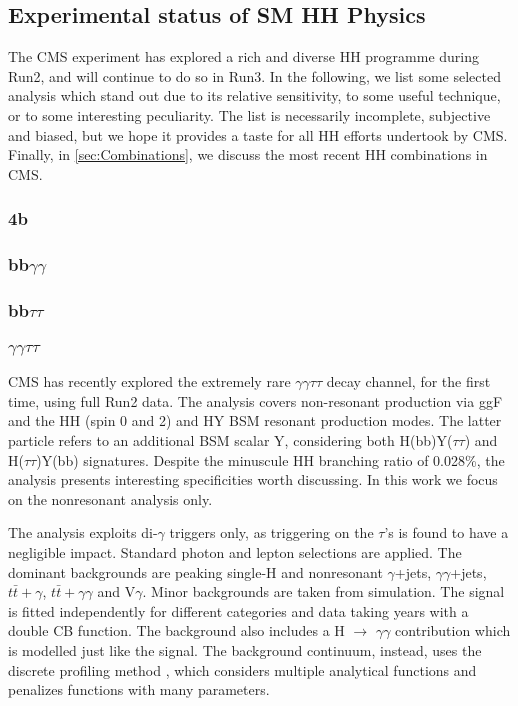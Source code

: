 \documentclass[11pt]{article}
\newcommand{\hgg}{H $\rightarrow$ $\gamma\gamma$}
\newcommand{\ttbar}{t\bar{t}}
\begin{document}
\subsection{Experimental status of SM HH Physics}
\label{sec:orgb825e03}
The \ac{CMS} experiment has explored a rich and diverse HH programme during Run2, and will continue to do so in Run3.
In the following, we list some selected analysis which stand out due to its relative sensitivity, to some useful technique, or to some interesting peculiarity.
The list is necessarily incomplete, subjective and biased, but we hope it provides a taste for all HH efforts undertook by \ac{CMS}.
Finally, in \cref{sec:Combinations}, we discuss the most recent HH combinations in \ac{CMS}.

\subsubsection{4b}
\label{sec:orgea7e127}
\label{sec:bbbb}
\subsubsection{bb\(\gamma \gamma\)}
\label{sec:orgca956e4}
\label{sec::bbgg}
\subsubsection{bb\(\tau \tau\)}
\label{sec:org9ba3362}
\label{sec::bbtautau}
\subsubsection{\(\gamma \gamma \tau \tau\)}
\label{sec:org7b90a0b}
\ac{CMS} has recently explored the extremely rare \(\gamma \gamma \tau \tau\) decay channel, for the first time, using full Run2 data.
The analysis covers non-resonant production via \ac{ggF} and the HH (spin 0 and 2) and HY \ac{BSM} resonant production modes.
The latter particle refers to an additional BSM scalar Y, considering both H(bb)Y(\(\tau \tau\)) and H(\(\tau \tau\))Y(bb) signatures.
Despite the minuscule HH branching ratio of 0.028\%, the analysis presents interesting specificities worth discussing.
In this work we focus on the nonresonant analysis only.

The analysis exploits di-\(\gamma\) triggers only, as triggering on the \(\tau\)'s is found to have a negligible impact.
Standard photon and lepton selections are applied.
The dominant backgrounds are peaking single-H and nonresonant \(\gamma\)+jets, \(\gamma \gamma\)+jets, \(\ttbar+\gamma\), \(\ttbar+\gamma\gamma\) and V\(\gamma\).
Minor backgrounds are taken from simulation.
The signal is fitted independently for different categories and data taking years with a double \ac{CB} function.
The background also includes a \hgg{} contribution which is modelled just like the signal.
The background continuum, instead, uses the discrete profiling method \cite{discrete_profiling}, which considers multiple analytical functions and penalizes functions with many parameters.
\end{document}
